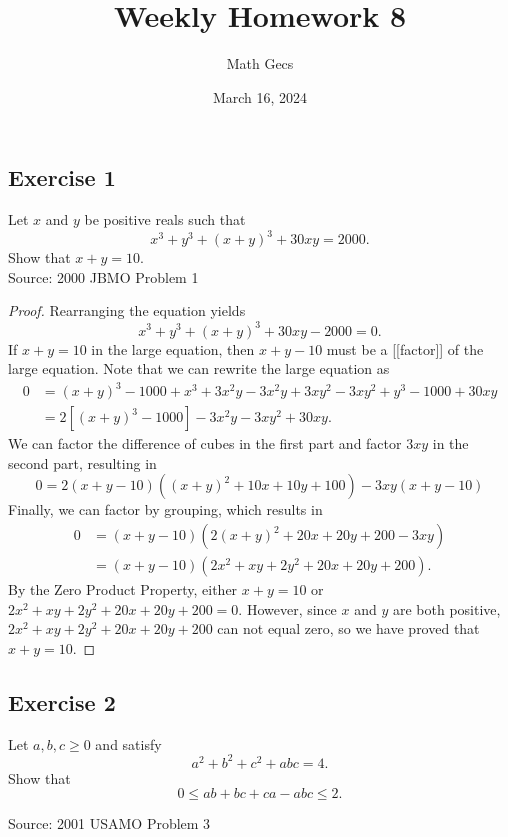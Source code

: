 \documentclass[12pt]{article}
\title{Weekly Homework 8}
\author{Math Gecs}
\date{March 16, 2024}
\begin{document}
\maketitle

\subsection*{Exercise 1}
Let $x$ and $y$ be positive reals such that $$ x^3 + y^3 + (x + y)^3 + 30xy = 2000. $$ Show that $x + y = 10$.\\

Source: 2000 JBMO Problem 1

\begin{proof}
Rearranging the equation yields
$$x^3 + y^3 + (x + y)^3 + 30xy - 2000 = 0.$$
If $x+y=10$ in the large equation, then $x+y-10$ must be a [[factor]] of the large equation.  Note that we can rewrite the large equation as
$$\begin{align*}
0 &= (x+y)^3 - 1000 + x^3 + 3x^2y - 3x^2y + 3xy^2 - 3xy^2 + y^3 - 1000 + 30xy \\
&= 2[(x+y)^3 - 1000] - 3x^2y - 3xy^2 + 30xy.
\end{align*}$$
We can factor the difference of cubes in the first part and factor $3xy$ in the second part, resulting in
$$0 = 2(x+y-10)((x+y)^2 + 10x + 10y + 100) - 3xy(x+y-10)$$
Finally, we can factor by grouping, which results in
$$\begin{align*}
0 &= (x+y-10)(2(x+y)^2 + 20x + 20y + 200 - 3xy) \\
&= (x+y-10)(2x^2 + xy + 2y^2 + 20x + 20y + 200).
\end{align*}$$
By the Zero Product Property, either $x+y=10$ or $2x^2 + xy + 2y^2 + 20x + 20y + 200 = 0.$  However, since $x$ and $y$ are both positive, $2x^2 + xy + 2y^2 + 20x + 20y + 200$ can not equal zero, so we have proved that $x+y = 10.$

\end{proof}

\vspace{2in}






\subsection*{Exercise 2}
Let $a, b, c \geq 0$ and satisfy
$$a^2 + b^2 + c^2 + abc = 4.$$
Show that
$$0 \le ab + bc + ca - abc \leq 2.$$


Source: 2001 USAMO Problem 3
\end{document}
